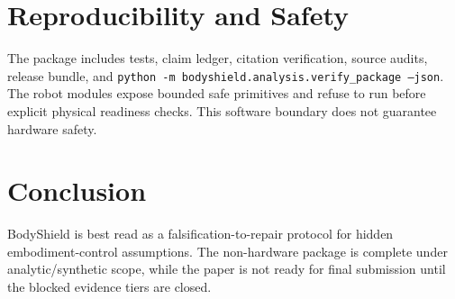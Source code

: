 \documentclass[10pt,conference]{IEEEtran}
\begin{document}
\section{Reproducibility and Safety}
The package includes tests, claim ledger, citation verification, source audits, release bundle, and \texttt{python -m bodyshield.analysis.verify\_package --json}. The robot modules expose bounded safe primitives and refuse to run before explicit physical readiness checks. This software boundary does not guarantee hardware safety.

\section{Conclusion}
BodyShield is best read as a falsification-to-repair protocol for hidden embodiment-control assumptions. The non-hardware package is complete under analytic/synthetic scope, while the paper is not ready for final submission until the blocked evidence tiers are closed.



\end{document}
